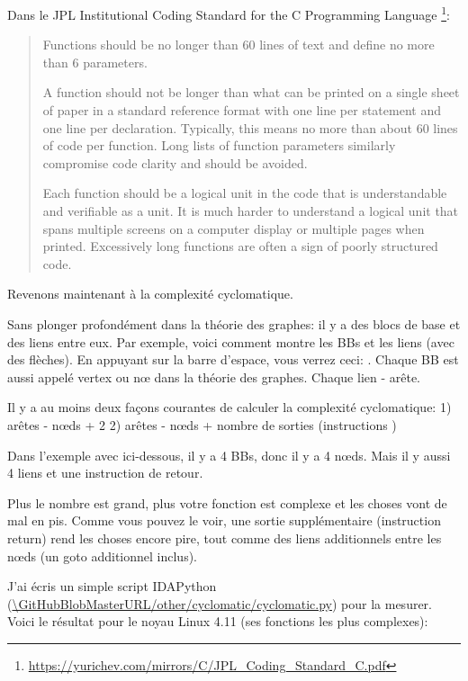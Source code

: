 Dans le JPL Institutional Coding Standard for the C Programming Language%
\footnote{\url{https://yurichev.com/mirrors/C/JPL_Coding_Standard_C.pdf}}:

\begin{framed}
\begin{quotation}
Functions should be no longer than 60 lines of text and define no more than 6 parameters.

A function should not be longer than what can be printed on a single sheet of paper in a standard reference format with one line per statement and one line per declaration. Typically, this means no more than about 60 lines of code per function. Long lists of function parameters similarly compromise code clarity and should be avoided.

Each function should be a logical unit in the code that is understandable and verifiable as a unit. It is much harder to understand a logical unit that spans multiple screens on a computer display or multiple pages when printed. Excessively long functions are often a sign of poorly structured code.
\end{quotation}
\end{framed}

Revenons maintenant à la complexité cyclomatique.

Sans plonger profondément dans la théorie des graphes: il y a des blocs de base
et des liens entre eux.
Par exemple, voici comment \IDA montre les \ac{BB}s et les liens (avec des flèches).
En appuyant sur la barre d'espace, vous verrez ceci: .
Chaque \ac{BB} est aussi appelé vertex ou n\oe{} dans la théorie des graphes.
Chaque lien - arête.

Il y a au moins deux façons courantes de calculer la complexité cyclomatique:
1) arêtes - n\oe{}ds + 2
2) arêtes - n\oe{}ds + nombre de sorties (instructions )

Dans l'exemple avec \IDA ici-dessous, il y a 4 \ac{BB}s, donc il y a 4 n\oe{}ds.
Mais il y aussi 4 liens et une instruction de retour.

Plus le nombre est grand, plus votre fonction est complexe et les choses vont de
mal en pis.
Comme vous pouvez le voir, une sortie supplémentaire (instruction return) rend
les choses encore pire, tout comme des liens additionnels entre les n\oe{}ds (un
goto additionnel inclus).

J'ai écris un simple script IDAPython (\url{\GitHubBlobMasterURL/other/cyclomatic/cyclomatic.py})
pour la mesurer.
Voici le résultat pour le noyau Linux 4.11 (ses fonctions les plus complexes):

